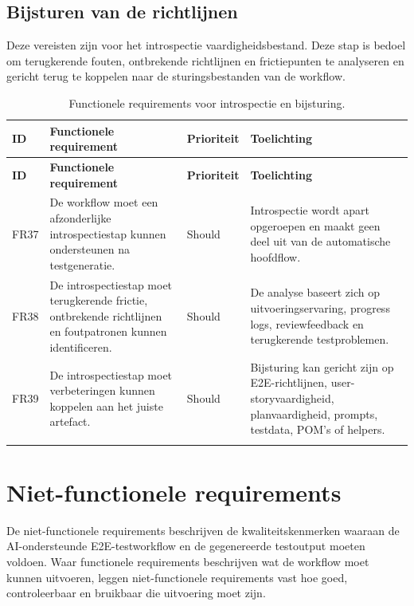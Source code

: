 \subsection{Bijsturen van de richtlijnen}
Deze vereisten zijn voor het introspectie vaardigheidsbestand. Deze stap is bedoel om terugkerende fouten, ontbrekende richtlijnen en frictiepunten te analyseren en gericht terug te koppelen naar de sturingsbestanden van de workflow.

\begin{longtable}{p{}p{}p{}p{}}
    \toprule
    \textbf{ID} & \textbf{Functionele requirement} & \textbf{Prioriteit} & \textbf{Toelichting} \\
    \midrule
    \endfirsthead
    
    \toprule
    \textbf{ID} & \textbf{Functionele requirement} & \textbf{Prioriteit} & \textbf{Toelichting} \\
    \midrule
    \endhead
    
    FR37 & De workflow moet een afzonderlijke introspectiestap kunnen ondersteunen na testgeneratie. & Should & Introspectie wordt apart opgeroepen en maakt geen deel uit van de automatische hoofdflow. \\
    \midrule
    FR38 & De introspectiestap moet terugkerende frictie, ontbrekende richtlijnen en foutpatronen kunnen identificeren. & Should & De analyse baseert zich op uitvoeringservaring, progress logs, reviewfeedback en terugkerende testproblemen. \\
    \midrule
    FR39 & De introspectiestap moet verbeteringen kunnen koppelen aan het juiste artefact. & Should & Bijsturing kan gericht zijn op E2E-richtlijnen, user-storyvaardigheid, planvaardigheid, prompts, testdata, POM's of helpers. \\
    
    \bottomrule
    \caption[Functionele requirements voor introspectie en bijsturing]{Functionele requirements voor introspectie en bijsturing.}
    \label{tab:fr-introspectie-bijsturing}
\end{longtable}


\section{Niet-functionele requirements}

De niet-functionele requirements beschrijven de kwaliteitskenmerken waaraan de AI-ondersteunde E2E-testworkflow en de gegenereerde testoutput moeten voldoen. Waar functionele requirements beschrijven wat de workflow moet kunnen uitvoeren, leggen niet-functionele requirements vast hoe goed, controleerbaar en bruikbaar die uitvoering moet zijn.

